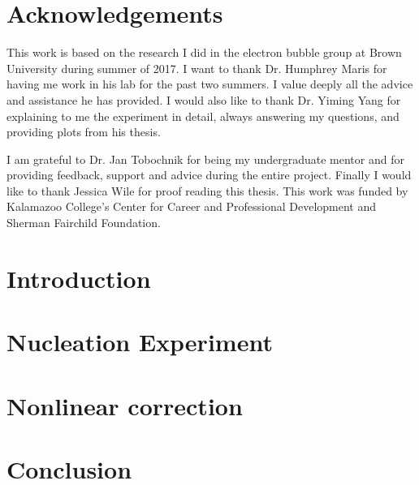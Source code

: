 \documentclass[12pt,twoside]{report}
\begin{document}
\chapter*{Acknowledgements}
 This work is based on the research I did in the electron bubble group at Brown University during summer of 2017. I want to thank Dr. Humphrey Maris for having me work in his lab for the past two summers. I value deeply all the advice and assistance he has provided. I would also like to thank Dr. Yiming Yang for explaining to me the experiment in detail, always answering my questions, and providing plots from his thesis.

I am grateful to Dr. Jan Tobochnik for being my undergraduate mentor and for providing feedback, support and advice during the entire project. Finally I would like to thank Jessica Wile for proof reading this thesis. This work was funded by Kalamazoo College's Center for Career and Professional Development and Sherman Fairchild Foundation.

\tableofcontents

\chapter{Introduction}


\chapter{Nucleation Experiment}


\chapter{Nonlinear correction}


\chapter{Conclusion}


\printbibliography
\end{document}
